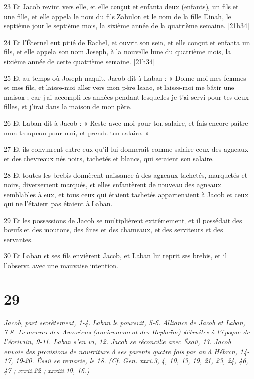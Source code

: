 \par 23 Et Jacob revint vers elle, et elle conçut et enfanta deux (enfants), un fils et une fille, et elle appela le nom du fils Zabulon et le nom de la fille Dinah, le septième jour le septième mois, la sixième année de la quatrième semaine. [21h34]
\par 24 Et l'Éternel eut pitié de Rachel, et ouvrit son sein, et elle conçut et enfanta un fils, et elle appela son nom Joseph, à la nouvelle lune du quatrième mois, la sixième année de cette quatrième semaine. [21h34]
\par 25 Et au temps où Joseph naquit, Jacob dit à Laban : « Donne-moi mes femmes et mes fils, et laisse-moi aller vers mon père Isaac, et laisse-moi me bâtir une maison ; car j'ai accompli les années pendant lesquelles je t'ai servi pour tes deux filles, et j'irai dans la maison de mon père.
\par 26 Et Laban dit à Jacob : « Reste avec moi pour ton salaire, et fais encore paître mon troupeau pour moi, et prends ton salaire. »
\par 27 Et ils convinrent entre eux qu'il lui donnerait comme salaire ceux des agneaux et des chevreaux nés noirs, tachetés et blancs, qui seraient son salaire.
\par 28 Et toutes les brebis donnèrent naissance à des agneaux tachetés, marquetés et noirs, diversement marqués, et elles enfantèrent de nouveau des agneaux semblables à eux, et tous ceux qui étaient tachetés appartenaient à Jacob et ceux qui ne l'étaient pas étaient à Laban.
\par 29 Et les possessions de Jacob se multiplièrent extrêmement, et il possédait des bœufs et des moutons, des ânes et des chameaux, et des serviteurs et des servantes.
\par 30 Et Laban et ses fils envièrent Jacob, et Laban lui reprit ses brebis, et il l'observa avec une mauvaise intention.

\chapter{29}

\par \textit{Jacob, part secrètement, 1-4. Laban le poursuit, 5-6. Alliance de Jacob et Laban, 7-8. Demeures des Amoréens (anciennement des Rephaïm) détruites à l'époque de l'écrivain, 9-11. Laban s'en va, 12. Jacob se réconcilie avec Ésaü, 13. Jacob envoie des provisions de nourriture à ses parents quatre fois par an à Hébron, 14-17, 19-20. Ésaü se remarie, le 18. (Cf. Gen. xxxi.3, 4, 10, 13, 19, 21, 23, 24, 46, 47 ; xxxii.22 ; xxxiii.10, 16.)}

